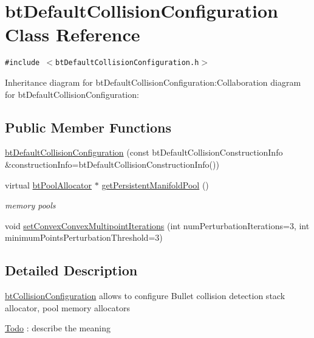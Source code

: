 \hypertarget{classbt_default_collision_configuration}{
\section{btDefaultCollisionConfiguration Class Reference}
\label{classbt_default_collision_configuration}
}
{\tt \#include $<$btDefaultCollisionConfiguration.h$>$}

Inheritance diagram for btDefaultCollisionConfiguration:Collaboration diagram for btDefaultCollisionConfiguration:\subsection*{Public Member Functions}
\begin{CompactItemize}
\item 
\hyperlink{classbt_default_collision_configuration_d08e7d72b0bd0d3f98290c2a1649b0d9}{btDefaultCollisionConfiguration} (const btDefaultCollisionConstructionInfo \&constructionInfo=btDefaultCollisionConstructionInfo())
\item 
\hypertarget{classbt_default_collision_configuration_5c11b78fe16465a5f6ea4e61af10265b}{
virtual \hyperlink{classbt_pool_allocator}{btPoolAllocator} $\ast$ \hyperlink{classbt_default_collision_configuration_5c11b78fe16465a5f6ea4e61af10265b}{getPersistentManifoldPool} ()}
\label{classbt_default_collision_configuration_5c11b78fe16465a5f6ea4e61af10265b}

\begin{CompactList}\small\item\em memory pools \item\end{CompactList}\item 
void \hyperlink{classbt_default_collision_configuration_39a173eedf0e8d55dd89ef3b637925a9}{setConvexConvexMultipointIterations} (int numPerturbationIterations=3, int minimumPointsPerturbationThreshold=3)
\end{CompactItemize}


\subsection{Detailed Description}
\hyperlink{classbt_collision_configuration}{btCollisionConfiguration} allows to configure Bullet collision detection stack allocator, pool memory allocators \begin{Desc}
\item[\hyperlink{todo__todo000012}{Todo}]: describe the meaning \end{Desc}



